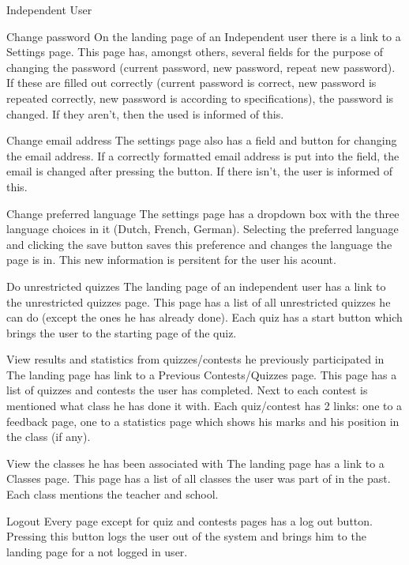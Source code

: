 \begin{section}{Independent User}

    \begin{subsection}{Change password}
		\label{indep-pass}
		On the landing page of an Independent user there is a link to a Settings page. This page has, amongst others, several fields for the purpose of changing the password (current password, new password, repeat new password). If these are filled out correctly (current password is correct, new password is repeated correctly, new password is according to specifications), the password is changed. If they aren't, then the used is informed of this.
    \end{subsection}
    \begin{subsection}{Change email address}
    	\label{indep-email}
    	The settings page also has a field and button for changing the email address. If a correctly formatted email address is put into the field, the email is changed after pressing the button. If there isn't, the user is informed of this.
    \end{subsection}
    \begin{subsection}{Change preferred language}
    The settings page has a dropdown box with the three language choices in it (Dutch, French, German). Selecting the preferred language and clicking the save button saves this preference and changes the language the page is in. This new information is persitent for the user his acount.
    	\label{indep-lang}
    \end{subsection}
    \begin{subsection}{Do unrestricted quizzes}
    	\label{indep-unrest}
    	The landing page of an independent user has a link to the unrestricted quizzes page. This page has a list of all unrestricted quizzes he can do (except the ones he has already done). Each quiz has a start button which brings the user to the starting page of the quiz.
    \end{subsection}
    \begin{subsection}{View results and statistics from quizzes/contests he previously participated in}
    	\label{indep-resstat}
    	The landing page has link to a Previous Contests/Quizzes page. This page has a list of quizzes and contests the user has completed. Next to each contest is mentioned what class he has done it with. Each quiz/contest has 2 links: one to a feedback page, one to a statistics page which shows his marks and his position in the class (if any).
    \end{subsection}
    \begin{subsection}{View the classes he has been associated with}
    The landing page has a link to a Classes page. This page has a list of all classes the user was part of in the past. Each class mentions the teacher and school.
    	\label{indep-class}
    \end{subsection}
    \begin{subsection}{Logout}
    	\label{indep-logout}
    	Every page except for quiz and contests pages has a log out button. Pressing this button logs the user out of the system and brings him to the landing page for a not logged in user.
    \end{subsection}
    

\end{section}
